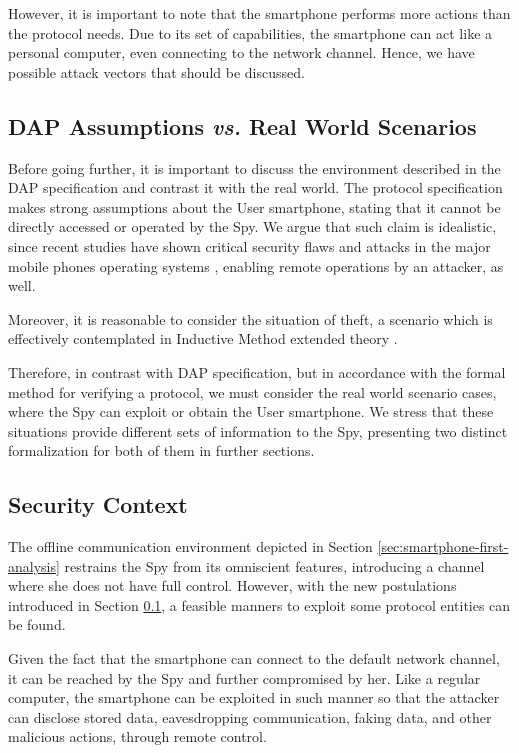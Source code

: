 However, it is important to note that the smartphone performs more actions than the protocol needs. Due to its set of capabilities, the smartphone can act like a personal computer, even connecting to the network channel. Hence, we have possible attack vectors that should be discussed.



\subsection{DAP Assumptions \textit{vs.} Real World Scenarios}
\label{sec:dap-assumptions}
Before going further, it is important to discuss the environment described in the DAP specification and contrast it with the real world. The protocol specification makes strong assumptions about the User smartphone, stating that it cannot be directly accessed or operated by the Spy. We argue that such claim is idealistic, since recent studies have shown critical security flaws and attacks in the major mobile phones operating systems \cite{android-malware,ios-malware}, enabling remote operations by an attacker, as well.

Moreover, it is reasonable to consider the situation of theft, a scenario which is effectively contemplated in Inductive Method extended theory \cite{bella-book}.

Therefore, in contrast with DAP specification, but in accordance with the formal method for verifying a protocol, we must consider the real world scenario cases, where the Spy can exploit or obtain the User smartphone. We stress that these situations provide different sets of information to the Spy, presenting two distinct formalization for both of them in further sections.



\subsection{Security Context}
The offline communication environment depicted in Section \ref{sec:smartphone-first-analysis} restrains the Spy from its omniscient features, introducing a channel where she does not have full control. However, with the new postulations introduced in Section \ref{sec:dap-assumptions}, a feasible manners to exploit some protocol entities can be found.

Given the fact that the smartphone can connect to the default network channel, it can be reached by the Spy and further compromised by her. Like a regular computer, the smartphone can be exploited in such manner so that the attacker can disclose stored data, eavesdropping communication, faking data, and other malicious actions, through remote control.

